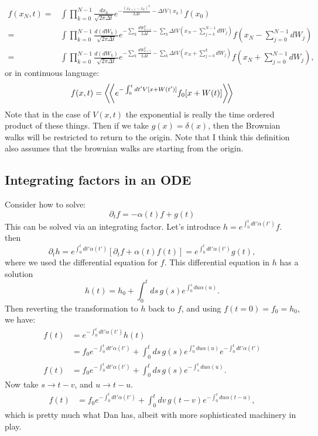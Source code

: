 \begin{align}
f(x_N,t)=& \int \prod_{k=0}^{N-1}\frac{dx_k}{\sqrt{2\pi \Delta t}} e^{-\frac{(x_{k+1}-x_k)^2}{2\Delta t} - \Delta t V(x_k)}f(x_0)\\
=& \int \prod_{k=0}^{N-1}\frac{d(dW_k)}{\sqrt{2\pi \Delta t}} e^{-\sum_k\frac{dW_{k+1}^2}{2\Delta t} - \sum_k\Delta t V(x_N-\sum_{j=k}^{N-1}dW_j)}f(x_N-\sum_{j=0}^{N-1}dW_j)\\
=& \int \prod_{k=0}^{N-1}\frac{d(dW_k)}{\sqrt{2\pi \Delta t}} e^{-\sum_k\frac{dW_{k+1}^2}{2\Delta t} - \sum_k \Delta t V(x_N+\sum_{j=0}^{k}dW_j)}f(x_N+\sum_{j=0}^{N-1}dW_j),
\end{align}
or in continuous language:
\begin{equation}
f(x,t)= \left\langle\!\left\langle e^{-\int_0^t dt'  V[x+W(t')]}f_0[x+W(t)]\right\rangle\!\right\rangle
\end{equation}
Note that in the case of $V(x,t)$ the exponential is really the time ordered product of these things.  Then if we take $g(x) = \delta(x)$, then the Brownian walks will be restricted to return to the origin.  Note that I think this definition also assumes that the brownian walks are starting from the origin.  

\subsection{Integrating factors in an ODE}

Consider how to solve: 
\begin{equation}
\partial_t f = -\alpha(t) f + g(t)
\end{equation}
This can be solved via an integrating factor.  Let's introduce $h = e^{\int_0^t dt' \alpha(t')} f$.  then 
\begin{equation}
\partial_t h = e^{\int_0^t dt'\alpha(t')} [\partial_t f +\alpha(t)f(t) ] = e^{\int_0^t dt'\alpha(t')} g(t),
\end{equation}
where we used the differential equation for $f$.  This differential equation in $h$ has a solution
\begin{equation}
h(t) = h_0 + \int_0^t ds\, g(s) e^{\int_0^{s} du \alpha(u)}.  
\end{equation}
Then reverting the transformation to $h$ back to $f$, and using $f(t=0)=f_0=h_0$,  we have: 
\begin{align}
f(t) &= e^{-\int_0^t dt' \alpha(t')}h(t)  \\
&= f_0e^{-\int_0^t dt' \alpha(t')} + \int_0^t ds\, g(s) e^{\int_0^{s} du \alpha(u)}e^{-\int_0^t dt' \alpha(t')}  \\
f(t)&= f_0e^{-\int_0^t dt' \alpha(t')} + \int_0^t ds\, g(s) e^{-\int_s^t du \alpha(u)}.
\end{align}
Now take $s \rightarrow t-v$, and $u \rightarrow t-u$.    
\begin{align}
f(t)&= f_0e^{-\int_0^t dt' \alpha(t')} + \int_0^t dv\, g(t-v) e^{-\int_{0}^v du \alpha(t-u)},
\end{align}
which is pretty much what Dan has, albeit with more sophisticated machinery in play.  

